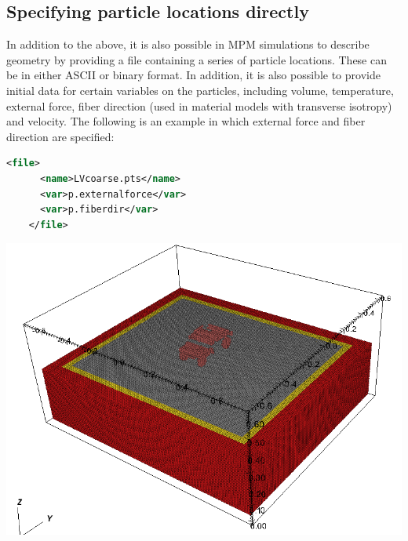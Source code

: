 \subsection{Specifying particle locations directly}
\begin{minipage}[t]{0.6\textwidth}
  \vspace{0pt}
  In addition to the above, it is also possible in MPM simulations to describe
  geometry by providing a file containing a series of particle locations.  These
  can be in either ASCII or binary format.  In addition, it is also possible to
  provide initial data for certain variables on the particles, including
  volume, temperature, external force, fiber direction (used in material models
  with transverse isotropy) and velocity.  The following is an example in which
  external force and fiber direction are specified:
  \begin{lstlisting}[language=XML]
    <file>
      <name>LVcoarse.pts</name>
      <var>p.externalforce</var>
      <var>p.fiberdir</var>
    </file>
  \end{lstlisting}
\end{minipage}
\hspace{12pt}
\begin{minipage}[t]{0.35\textwidth}
  \vspace{0pt}
  \centering
  \includegraphics[width=0.9\columnwidth]{FIGS/geometry/geom_file_input.png}
\end{minipage}

